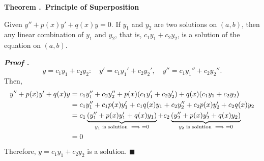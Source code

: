 \documentclass[12pt, a4paper]{article}
\newcounter{index}[subsection]
\newenvironment*{thm}[1]{\begin{tcolorbox}\par\noindent\textbf{Theorem \thesubsection.\stepcounter{index}\theindex\ #1} \par}{\par\end{tcolorbox}}
\newcounter{nprf}[subsection]
\newenvironment*{prf}{\par\indent\textbf{\textit{Proof \stepcounter{nprf}\thenprf.}}}{\hfill$\blacksquare$\par}
\begin{document}
\begin{thm}{Principle of Superposition}
	Given $y''+p(x)y'+q(x)y=0$. If $y_1$ and $y_2$ are two solutions on $(a,b)$, then any linear combination of $y_1$ and $y_2$, that is, $c_1y_1+c_2y_2$, is a solution of the equation on $(a,b)$.	
\end{thm}
\begin{prf}
	\[y=c_1y_1+c_2y_2:\quad y'=c_1y_1'+c_2y_2',\quad y''=c_1y_1''+c_2y_2''.\] Then, \begin{align*}y''+p(x)y'+q(x)y&=c_1y_1''+c_2y_2''+p(x)\qty(c_1y_1'+c_2y_2')+q(x)\qty(c_1y_1+c_2y_2)\\&=c_1y_1''+c_1p(x)y_1'+c_1q(x)y_1+ c_2y_2''+c_2p(x)y_2'+c_2q(x)y_2\\&=c_1\underbrace{\qty(y_1''+p(x)y_1'+q(x)y_1)}_{y_1\text{ is solution }\implies=0}+c_2\underbrace{\qty(y_2''+p(x)y_2'+q(x)y_2)}_{y_2\text{ is solution }\implies= 0}\\&=0\end{align*} Therefore, $y=c_1y_1+c_2y_2$ is a solution.
\end{prf}
\end{document}
